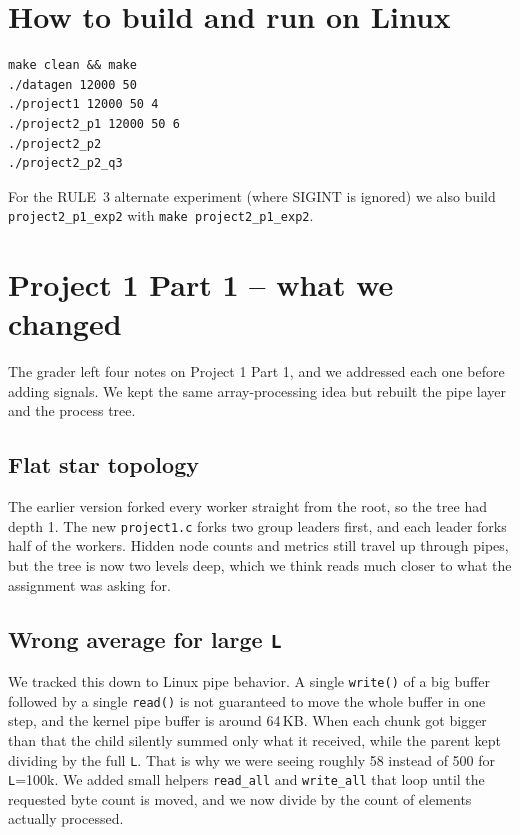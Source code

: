 \documentclass[11pt]{article}
\begin{document}
\section*{How to build and run on Linux}
\begin{verbatim}
make clean && make
./datagen 12000 50
./project1 12000 50 4
./project2_p1 12000 50 6
./project2_p2
./project2_p2_q3
\end{verbatim}
For the RULE~3 alternate experiment (where SIGINT is ignored) we also build
\texttt{project2\_p1\_exp2} with \verb|make project2_p1_exp2|.

\section{Project 1 Part 1 -- what we changed}

The grader left four notes on Project 1 Part 1, and we addressed each one before
adding signals. We kept the same array-processing idea but rebuilt the pipe
layer and the process tree.

\subsection*{Flat star topology}
The earlier version forked every worker straight from the root, so the tree had
depth 1. The new \texttt{project1.c} forks two group leaders first, and each
leader forks half of the workers. Hidden node counts and metrics still travel
up through pipes, but the tree is now two levels deep, which we think reads
much closer to what the assignment was asking for.

\subsection*{Wrong average for large \texttt{L}}
We tracked this down to Linux pipe behavior. A single \texttt{write()} of a big
buffer followed by a single \texttt{read()} is not guaranteed to move the whole
buffer in one step, and the kernel pipe buffer is around 64\,KB. When each
chunk got bigger than that the child silently summed only what it received,
while the parent kept dividing by the full \texttt{L}. That is why we were
seeing roughly 58 instead of 500 for \texttt{L}=100k. We added small helpers
\texttt{read\_all} and \texttt{write\_all} that loop until the requested byte
count is moved, and we now divide by the count of elements actually processed.
\end{document}
